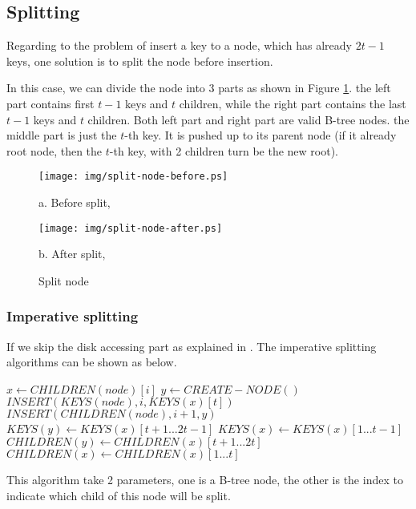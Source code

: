 \documentclass{article}
\begin{document}
\subsection{Splitting}
\label{split}
Regarding to the problem of insert a key to a node, which has already
$2t-1$ keys, one solution is to split the node before insertion.

In this case, we can divide the node into 3 parts as shown in
Figure \ref{fig:node-split}. the left part contains first $t-1$ keys
and $t$ children, while the right part contains the last $t-1$ keys
and $t$ children. Both left part and right part are valid B-tree
nodes. the middle part is just the $t$-th key. It is pushed up
to its parent node (if it already root node, then the $t$-th key,
with 2 children turn be the new root).

\begin{figure}[htbp]
       \begin{center}
       	  \texttt{[image: img/split-node-before.ps]}

          a. Before split,

          \texttt{[image: img/split-node-after.ps]}

          b. After split,
        \caption{Split node} \label{fig:node-split}
       \end{center}
\end{figure}

\subsubsection{Imperative splitting}
If we skip the disk accessing part as explained in \cite{CLRS}. The
imperative splitting algorithms can be shown as below.

\begin{algorithmic}[1]
  \State $x \leftarrow CHILDREN(node)[i]$
  \State $y \leftarrow CREATE-NODE()$
  \State $INSERT(KEYS(node), i, KEYS(x)[t])$
  \State $INSERT(CHILDREN(node), i+1, y)$
  \State $KEYS(y) \leftarrow KEYS(x)[t+1 ... 2t-1]$
  \State $KEYS(x) \leftarrow KEYS(x)[1 ... t-1]$
    \State $CHILDREN(y) \leftarrow CHILDREN(x)[t+1 ... 2t]$
    \State $CHILDREN(x) \leftarrow CHILDREN(x)[1 ... t]$
  \EndIf
\EndProcedure
\end{algorithmic}

This algorithm take 2 parameters, one is a B-tree node, the other
is the index to indicate which child of this node will be split.
\end{document}
